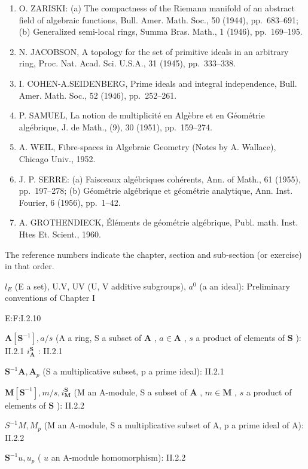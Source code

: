 \begin{enumerate}
\item
  O. ZARISKI: (a) The compactness of the Riemann manifold of an abstract field of algebraic functions, Bull. Amer. Math. Soc., 50 (1944), pp.~683--691; (b) Generalized semi-local rings, Summa Bras. Math., 1 (1946), pp.~169--195.
\item
  N. JACOBSON, A topology for the set of primitive ideals in an arbitrary ring, Proc. Nat. Acad. Sci. U.S.A., 31 (1945), pp.~333--338.
\item
  I. COHEN-A.SEIDENBERG, Prime ideals and integral independence, Bull. Amer. Math. Soc., 52 (1946), pp.~252--261.
\item
  P. SAMUEL, La notion de multiplicité en Algèbre et en Géométrie algébrique, J. de Math., (9), 30 (1951), pp.~159--274.
\item
  A. WEIL, Fibre-spaces in Algebraic Geometry (Notes by A. Wallace), Chicago Univ., 1952.
\item
  J. P. SERRE: (a) Faisceaux algébriques cohérents, Ann. of Math., 61 (1955), pp.~197--278; (b) Géométrie algébrique et géométrie analytique, Ann. Inst. Fourier, 6 (1956), pp.~1--42.
\item
  A. GROTHENDIECK, Éléments de géométrie algébrique, Publ. math. Inst. Htes Et. Scient., 1960.
\end{enumerate}


The reference numbers indicate the chapter, section and sub-section (or exercise) in that order.

\(l_{E}\) (E a set), U.V, UV (U, V additive subgroups), \(a^{0}\) (a an ideal): Preliminary conventions of Chapter I

E:F:I.2.10

\(\mathbf{A}[\mathbf{S}^{-1}], a / s\) (A a ring, S a subset of \(\mathbf{A}\) , \(a \in \mathbf{A}\) , \(s\) a product of elements of \(\mathbf{S}\) ): II.2.1 \(i_{\mathbf{A}}^{\mathbf{S}}\) : II.2.1

\(\mathbf{S}^{-1}\mathbf{A},\mathbf{A}_{p}\) (S a multiplicative subset, p a prime ideal): II.2.1

\(\mathbf{M}[\mathbf{S}^{-1}], m / s, i_{\mathbf{M}}^{\mathbf{S}}\) (M an A-module, S a subset of \(\mathbf{A}\) , \(m \in \mathbf{M}\) , \(s\) a product of elements of \(\mathbf{S}\) ): II.2.2

\(S^{-1}M, M_{p}\) (M an A-module, S a multiplicative subset of A, p a prime ideal of A): II.2.2

\(\mathbf{S}^{-1}u, u_{p}\) ( \(u\) an A-module homomorphism): II.2.2

